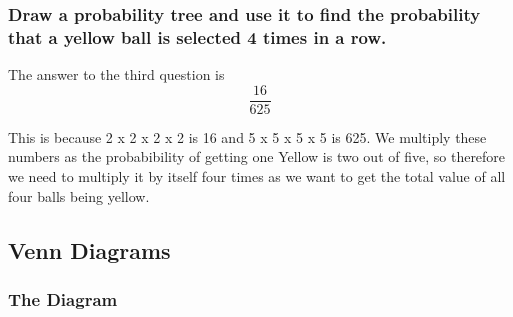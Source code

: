 \documentclass[a4paper,12pt]{article}
\begin{document}
\subsubsection{Draw a probability tree and use it to find the probability that a yellow ball is selected 4 times in a row.}

The answer to the third question is
\[
  \frac{16}{625}
\]

This is because 2 x 2 x 2 x 2 is 16 and 5 x 5 x 5 x 5 is 625. We multiply these numbers as the probabibility of getting one Yellow is two out of five, so therefore we need to multiply it by itself four times as we want to get the total value of all four balls being yellow.

\newpage

\subsection{Venn Diagrams}

\subsubsection{The Diagram}

\def\firstcircle{(0,0) circle (1.5cm)}
\def\secondcircle{(55:2cm) circle (1.5cm)}
\def\thirdcircle{(0:2cm) circle (1.5cm)}
\def\forthcircle{(5,0.5) circle (1.5cm)}
\end{document}
